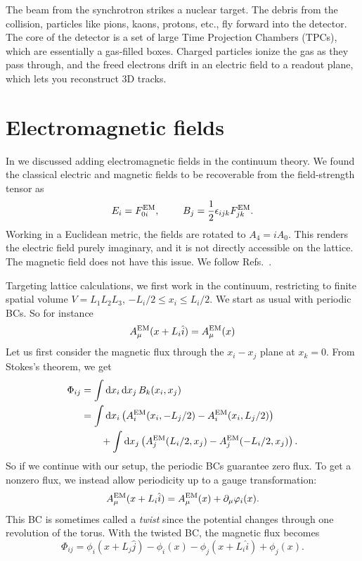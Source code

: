 The beam from the synchrotron strikes a nuclear target. The debris from the 
collision, particles like pions, kaons, protons, etc., fly forward into the 
detector. The core of the detector is a set of large Time Projection Chambers 
(TPCs), which are essentially a gas-filled boxes. Charged particles ionize 
the gas as they pass through, and the freed electrons drift
in an electric field to a readout plane, which lets you reconstruct 3D tracks.


\section{Electromagnetic fields}\label{sec:latEM}
In  we discussed adding electromagnetic fields in the
continuum theory. We found the classical electric and magnetic fields to be
recoverable from the field-strength tensor as
\begin{equation}
E_i=F^{\rm EM}_{0i},~~~~~~~B_j=\frac{1}{2}\epsilon_{ijk}F^{\rm EM}_{jk}.
\end{equation}
Working in a Euclidean metric, the fields are rotated to $A_4=iA_0$.
This renders the electric field purely imaginary, and it is not directly
accessible on the lattice. The magnetic field does not have this issue.
We follow Refs.~\cite{brandt_thermal_2023,valois_thermal_2025,kleinehanding_magnetic_2026}.

Targeting lattice calculations, we first work in the continuum, restricting to
finite spatial volume $V=L_1L_2L_3$, $-L_i/2\leq x_i\leq L_i/2$. We start as
usual with periodic BCs. So for instance
\begin{equation}
A^{\rm EM}_\mu(x+L_i\hat{i})=A^{\rm EM}_\mu(x)
\end{equation}
Let us first consider the magnetic flux through the 
$x_i-x_j$ plane at $x_k=0$. From Stokes's theorem, we get
\begin{equation}\begin{aligned}
\Phi_{ij}&=\int\dd{x_i}\dd{x_j}B_k(x_i,x_j)\\
         &=\int\dd{x_i}\left(A^{\rm EM}_i(x_i,-L_j/2)-A^{\rm EM}_i(x_i,L_j/2)\right)\\
&~~~~~~+\int\dd{x_j}\left(A^{\rm EM}_j(L_i/2,x_j)-A^{\rm EM}_j(-L_i/2,x_j)\right).
\end{aligned}\end{equation}
So if we continue with our setup, the periodic BCs guarantee zero flux.
To get a nonzero flux, we instead allow periodicity up to a gauge
transformation:
\begin{equation}
A^{\rm EM}_\mu(x+L_i\hat{i})=A^{\rm EM}_\mu(x)+\partial_\mu\varphi_i(x).
\end{equation}
This BC is sometimes called a {\it twist} since the
potential changes through one revolution of the torus.
With the twisted BC, the magnetic flux becomes
\begin{equation}
\Phi_{ij}=\phi_i(x+L_j\hat{j})-\phi_i(x)-\phi_j(x+L_i\hat{i})+\phi_j(x).
\end{equation}

